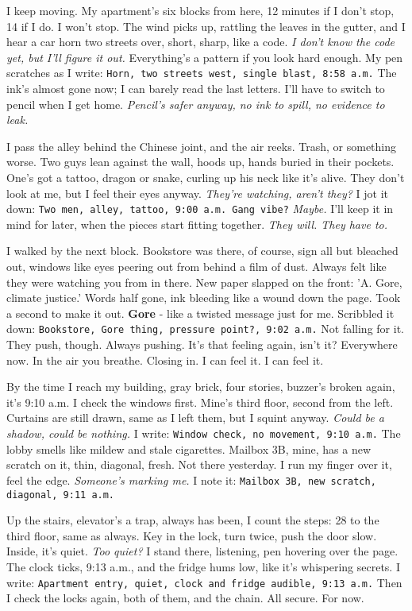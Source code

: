 \documentclass[12pt,oneside]{book}
\newcommand{\note}[1]{\texttt{#1}}
\begin{document}
I keep moving. My apartment’s six blocks from here, 12 minutes if I don’t stop, 14 if I do. I won’t stop. The wind picks up, rattling the leaves in the gutter, and I hear a car horn two streets over, short, sharp, like a code. \textit{I don’t know the code yet, but I’ll figure it out.} Everything’s a pattern if you look hard enough. My pen scratches as I write: \note{Horn, two streets west, single blast, 8:58 a.m.} The ink’s almost gone now; I can barely read the last letters. I’ll have to switch to pencil when I get home. \textit{Pencil’s safer anyway, no ink to spill, no evidence to leak.}

I pass the alley behind the Chinese joint, and the air reeks. Trash, or something worse. Two guys lean against the wall, hoods up, hands buried in their pockets. One’s got a tattoo, dragon or snake, curling up his neck like it’s alive. They don’t look at me, but I feel their eyes anyway. \textit{They’re watching, aren’t they?} I jot it down: \note{Two men, alley, tattoo, 9:00 a.m. Gang vibe?} \textit{Maybe.} I’ll keep it in mind for later, when the pieces start fitting together. \textit{They will. They have to.}

I walked by the next block. Bookstore was there, of course, sign all but bleached out, windows like eyes peering out from behind a film of dust. Always felt like they were watching you from in there.  New paper slapped on the front: 'A. Gore, climate justice.' Words half gone, ink bleeding like a wound down the page. Took a second to make it out.  \textbf{Gore} - like a twisted message just for me.  Scribbled it down: \note{Bookstore, Gore thing, pressure point?, 9:02 a.m.}  Not falling for it.  They push, though.  Always pushing.  It's that feeling again, isn't it?  Everywhere now.  In the air you breathe. Closing in. I can feel it. I can feel it.

By the time I reach my building, gray brick, four stories, buzzer’s broken again, it’s 9:10 a.m. I check the windows first. Mine’s third floor, second from the left. Curtains are still drawn, same as I left them, but I squint anyway. \textit{Could be a shadow, could be nothing.} I write: \note{Window check, no movement, 9:10 a.m.} The lobby smells like mildew and stale cigarettes. Mailbox 3B, mine, has a new scratch on it, thin, diagonal, fresh. Not there yesterday. I run my finger over it, feel the edge. \textit{Someone’s marking me.} I note it: \note{Mailbox 3B, new scratch, diagonal, 9:11 a.m.}

Up the stairs, elevator’s a trap, always has been, I count the steps: 28 to the third floor, same as always. Key in the lock, turn twice, push the door slow. Inside, it’s quiet. \textit{Too quiet?} I stand there, listening, pen hovering over the page. The clock ticks, 9:13 a.m., and the fridge hums low, like it’s whispering secrets. I write: \note{Apartment entry, quiet, clock and fridge audible, 9:13 a.m.} Then I check the locks again, both of them, and the chain. All secure. For now.
\end{document}
